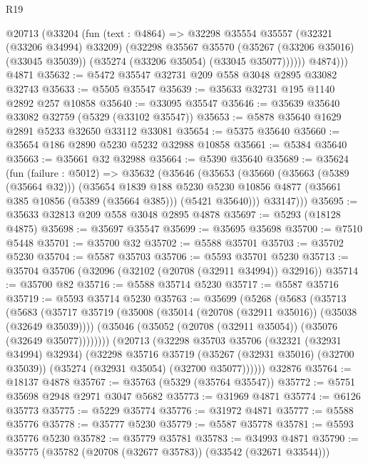 \begin{lexlean}{R19}
\begin{coremodule}
        @20713
          (@33204
            (fun (text : @4864) =>
            @32298
              @35554
              @35557
              (@32321 (@33206 @34994) @33209)
              (@32298
                @35567
                @35570
                (@35267 (@33206 @35016) (@33045 @35039))
                (@35274 (@33206 @35054) (@33045 @35077))))))
          @4874)))
    @4871
@35632 := @5472 @35547 @32731 @209 @558 @3048 @2895 @33082 @32743
@35633 := @5505 @35547
@35639 := @35633 @32731 @195 @1140 @2892 @257 @10858
@35640 := @33095 @35547
@35646 := @35639 @35640 @33082 @32759 (@5329 (@33102 @35547))
@35653 := @5878 @35640 @1629 @2891 @5233 @32650 @33112 @33081
@35654 := @5375 @35640
@35660 := @35654 @186 @2890 @5230 @5232 @32988 @10858
@35661 := @5384 @35640
@35663 := @35661 @32 @32988
@35664 := @5390 @35640
@35689 := @35624
    (fun (failure : @5012) =>
    @35632
      (@35646
        (@35653
          (@35660
            (@35663 (@5389 (@35664 @32)))
            (@35654
              @1839
              @188
              @5230
              @5230
              @10856
              @4877
              (@35661 @385 @10856 (@5389 (@35664 @385)))
              (@5421 @35640)))
          @33147)))
@35695 := @35633 @32813 @209 @558 @3048 @2895 @4878
@35697 := @5293 (@18128 @4875)
@35698 := @35697 @35547
@35699 := @35695 @35698
@35700 := @7510 @5448
@35701 := @35700 @32
@35702 := @5588 @35701
@35703 := @35702 @5230
@35704 := @5587 @35703
@35706 := @5593 @35701 @5230
@35713 := @35704 @35706 (@32096 (@32102 (@20708 (@32911 @34994)) @32916))
@35714 := @35700 @82
@35716 := @5588 @35714 @5230
@35717 := @5587 @35716
@35719 := @5593 @35714 @5230
@35763 := @35699
    (@5268
      (@5683
        (@35713
          (@5683
            (@35717
              @35719
              (@35008 (@35014 (@20708 (@32911 @35016)) (@35038 (@32649 @35039))))
              (@35046 (@35052 (@20708 (@32911 @35054)) (@35076 (@32649 @35077))))))))
      (@20713
        (@32298
          @35703
          @35706
          (@32321 (@32931 @34994) @32934)
          (@32298
            @35716
            @35719
            (@35267 (@32931 @35016) (@32700 @35039))
            (@35274 (@32931 @35054) (@32700 @35077))))))
    @32876
@35764 := @18137 @4878
@35767 := @35763 (@5329 (@35764 @35547))
@35772 := @5751 @35698 @2948 @2971 @3047 @5682
@35773 := @31969 @4871
@35774 := @6126 @35773
@35775 := @5229 @35774
@35776 := @31972 @4871
@35777 := @5588 @35776
@35778 := @35777 @5230
@35779 := @5587 @35778
@35781 := @5593 @35776 @5230
@35782 := @35779 @35781
@35783 := @34993 @4871
@35790 := @35775 (@35782 (@20708 (@32677 @35783)) (@33542 (@32671 @33544)))

\end{coremodule}
\end{lexlean}
